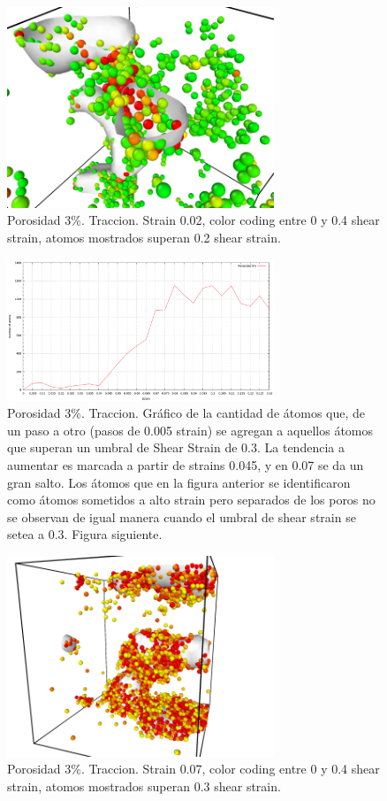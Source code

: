 \documentclass[10pt, oneside]{article} %
\begin{document}
\begin{figure}[H]
\centering
\includegraphics[width=8cm]{Figures/Porosidad/porosidad_3_strain002_color_0_04.png}
\caption{Porosidad 3\%. Traccion. Strain 0.02, color coding entre 0 y 0.4 shear strain, atomos mostrados superan 0.2 shear strain. }
\end{figure}

\begin{figure}[H]
\centering
\includegraphics[width=8cm]{Figures/Porosidad/porosidad_trac_umbral3.png}
\caption{Porosidad 3\%. Traccion. Gráfico de la cantidad de átomos que, de un paso a otro (pasos de 0.005 strain) se agregan a aquellos átomos que superan un umbral de Shear Strain de 0.3. La tendencia a aumentar es marcada a partir de strains 0.045, y en 0.07 se da un gran salto. Los átomos que en la figura anterior se identificaron como átomos sometidos a alto strain pero separados de los poros no se observan de igual manera cuando el umbral de shear strain se setea a 0.3. Figura siguiente.}
\end{figure}

\begin{figure}[H]
\centering
\includegraphics[width=8cm]{Figures/Porosidad/porosidad_3_strain007_color_0_04.png}
\caption{Porosidad 3\%. Traccion. Strain 0.07, color coding entre 0 y 0.4 shear strain, atomos mostrados superan 0.3 shear strain.}
\end{figure}
\end{document}
